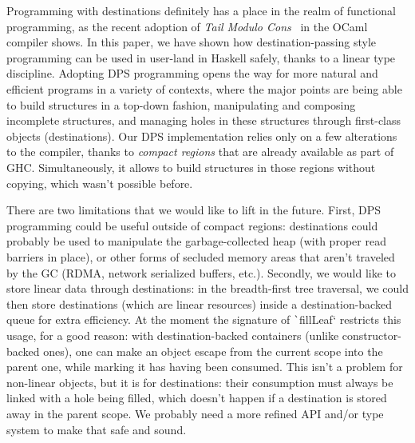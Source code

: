 \documentclass[english]{jflart}
\begin{document}
Programming with destinations definitely has a place in the realm of functional programming, as the recent adoption of \emph{Tail Modulo Cons}~\cite{bour_tmc_2021} in the OCaml compiler shows. In this paper, we have shown how destination-passing style programming can be used in user-land in Haskell safely, thanks to a linear type discipline. Adopting DPS programming opens the way for more natural and efficient programs in a variety of contexts, where the major points are being able to build structures in a top-down fashion, manipulating and composing incomplete structures, and managing holes in these structures through first-class objects (destinations). Our DPS implementation relies only on a few alterations to the compiler, thanks to \emph{compact regions} that are already available as part of GHC. Simultaneously, it allows to build structures in those regions without copying, which wasn't possible before.

There are two limitations that we would like to lift in the future. First, DPS programming could be useful outside of compact regions: destinations could probably be used to manipulate the garbage-collected heap (with proper read barriers in place), or other forms of secluded memory areas that aren't traveled by the GC (RDMA, network serialized buffers, etc.). Secondly, we would like to store linear data through destinations: in the breadth-first tree traversal, we could then store destinations (which are linear resources) inside a destination-backed queue for extra efficiency. At the moment the signature of \texttt`fillLeaf` restricts this usage, for a good reason: with destination-backed containers (unlike constructor-backed ones), one can make an object escape from the current scope into the parent one, while marking it has having been consumed. This isn't a problem for non-linear objects, but it is for destinations: their consumption must always be linked with a hole being filled, which doesn't happen if a destination is stored away in the parent scope. We probably need a more refined API and/or type system to make that safe and sound.

\clearpage{}
{}

\end{document}
